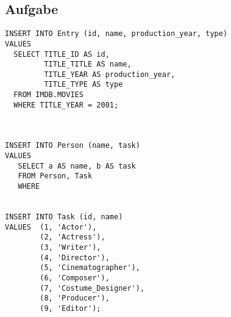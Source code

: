 \documentclass[11pt,a4paper,DIV=9]{scrartcl}
\newcounter{temp}
\newcommand{\aufgabe}[1]{
  \setcounter{temp}{\value{subsection}}
  \setcounter{subsection}{#1}
  \addtocounter{subsection}{-1}
  \subsection{Aufgabe}
  \setcounter{subsection}{\value{temp}}
}
\begin{document}
\aufgabe{4}
\begin{lstlisting}
INSERT INTO Entry (id, name, production_year, type)
VALUES
  SELECT TITLE_ID AS id,
         TITLE_TITLE AS name,
         TITLE_YEAR AS production_year,
         TITLE_TYPE AS type
  FROM IMDB.MOVIES
  WHERE TITLE_YEAR = 2001;



INSERT INTO Person (name, task)
VALUES
   SELECT a AS name, b AS task
   FROM Person, Task
   WHERE


INSERT INTO Task (id, name)
VALUES  (1, 'Actor'),
        (2, 'Actress'),
        (3, 'Writer'),
        (4, 'Director'),
        (5, 'Cinematographer'),
        (6, 'Composer'),
        (7, 'Costume_Designer'),
        (8, 'Producer'),
        (9, 'Editor');
\end{lstlisting}
\end{document}
